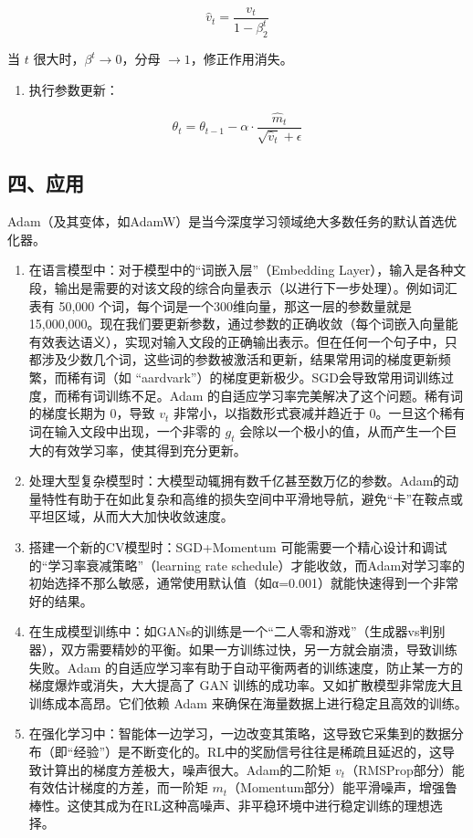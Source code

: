 \[
\hat{v}_t = \frac{v_t}{1-\beta_2^t}
\]

当 \(t\) 很大时，\(\beta^t \to 0\)，分母 \(\to 1\)，修正作用消失。

\begin{enumerate}
\def\labelenumi{\arabic{enumi}.}
\setcounter{enumi}{6}
\tightlist
\item
{}
  执行参数更新：
\end{enumerate}

\[
\theta_t = \theta_{t-1} - \alpha \cdot \frac{\hat{m}_t}{\sqrt{\hat{v}_t}+\epsilon}
\]

\hypertarget{ux56dbux5e94ux7528}{%
\subsection{四、应用}\label{ux56dbux5e94ux7528}}

Adam（及其变体，如AdamW）是当今深度学习领域绝大多数任务的默认首选优化器。

\begin{enumerate}
\def\labelenumi{\arabic{enumi}.}
\item
  在语言模型中：对于模型中的``词嵌入层''（Embedding Layer），输入是各种文段，输出是需要的对该文段的综合向量表示（以进行下一步处理）。例如词汇表有 50,000 个词，每个词是一个300维向量，那这一层的参数量就是15,000,000。现在我们要更新参数，通过参数的正确收敛（每个词嵌入向量能有效表达语义），实现对输入文段的正确输出表示。但在任何一个句子中，只都涉及少数几个词，这些词的参数被激活和更新，结果常用词的梯度更新频繁，而稀有词（如 ``aardvark''）的梯度更新极少。SGD会导致常用词训练过度，而稀有词训练不足。Adam 的自适应学习率完美解决了这个问题。稀有词的梯度长期为 \(0\)，导致 \(v_t\) 非常小，以指数形式衰减并趋近于 \(0\)。一旦这个稀有词在输入文段中出现，一个非零的 \(g_t\) 会除以一个极小的值，从而产生一个巨大的有效学习率，使其得到充分更新。
\item
  处理大型复杂模型时：大模型动辄拥有数千亿甚至数万亿的参数。Adam的动量特性有助于在如此复杂和高维的损失空间中平滑地导航，避免``卡''在鞍点或平坦区域，从而大大加快收敛速度。
\item
  搭建一个新的CV模型时：SGD+Momentum 可能需要一个精心设计和调试的``学习率衰减策略''（learning rate schedule）才能收敛，而Adam对学习率的初始选择不那么敏感，通常使用默认值（如α=0.001）就能快速得到一个非常好的结果。
\item
  在生成模型训练中：如GANs的训练是一个``二人零和游戏''（生成器vs判别器），双方需要精妙的平衡。如果一方训练过快，另一方就会崩溃，导致训练失败。Adam 的自适应学习率有助于自动平衡两者的训练速度，防止某一方的梯度爆炸或消失，大大提高了 GAN 训练的成功率。又如扩散模型非常庞大且训练成本高昂。它们依赖 Adam 来确保在海量数据上进行稳定且高效的训练。
\item
  在强化学习中：智能体一边学习，一边改变其策略，这导致它采集到的数据分布（即``经验''）是不断变化的。RL中的奖励信号往往是稀疏且延迟的，这导致计算出的梯度方差极大，噪声很大。Adam的二阶矩 \(v_t\)（RMSProp部分）能有效估计梯度的方差，而一阶矩 \(m_t\)（Momentum部分）能平滑噪声，增强鲁棒性。这使其成为在RL这种高噪声、非平稳环境中进行稳定训练的理想选择。
\end{enumerate}

